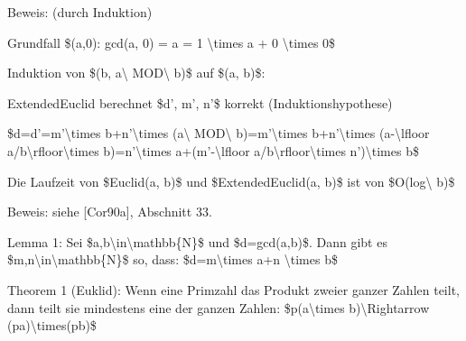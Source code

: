 \documentclass[a4paper]{article}
\begin{document}
\begin{multicols}{3}
\begin{itemize*}
            \begin{itemize*}
                  \item Beweis: (durch Induktion)
                  \begin{itemize*} \item Grundfall \$(a,0): gcd(a, 0) = a = 1 \textbackslash times a + 0 \textbackslash times 0\$ \item Induktion von \$(b, a\textbackslash{} MOD\textbackslash{} b)\$ auf \$(a, b)\$:
                        \begin{itemize*} \item ExtendedEuclid berechnet \$d', m', n'\$ korrekt (Induktionshypothese) \item \$d=d'=m'\textbackslash times b+n'\textbackslash times (a\textbackslash{} MOD\textbackslash{} b)=m'\textbackslash times b+n'\textbackslash times (a-\textbackslash lfloor a/b\textbackslash rfloor\textbackslash times b)=n'\textbackslash times a+(m'-\textbackslash lfloor a/b\textbackslash rfloor\textbackslash times n')\textbackslash times b\$ \end{itemize*} \end{itemize*}
                  \item Die Laufzeit von \$Euclid(a, b)\$ und \$ExtendedEuclid(a, b)\$ ist von \$O(log\textbackslash{} b)\$
                  \begin{itemize*} \item Beweis: siehe {[}Cor90a{]}, Abschnitt 33. \end{itemize*}
                  \item Lemma 1: Sei \$a,b\textbackslash in\textbackslash mathbb\{N\}\$ und \$d=gcd(a,b)\$. Dann gibt es \$m,n\textbackslash in\textbackslash mathbb\{N\}\$ so, dass: \$d=m\textbackslash times a+n \textbackslash times b\$
            \end{itemize*}
            \item
            Theorem 1 (Euklid): Wenn eine Primzahl das Produkt zweier ganzer
            Zahlen teilt, dann teilt sie mindestens eine der ganzen Zahlen:
            \$p\textbar(a\textbackslash times b)\textbackslash Rightarrow
            (p\textbar a)\textbackslash times(p\textbar b)\$


\end{itemize*}
\end{multicols}
\end{document}
